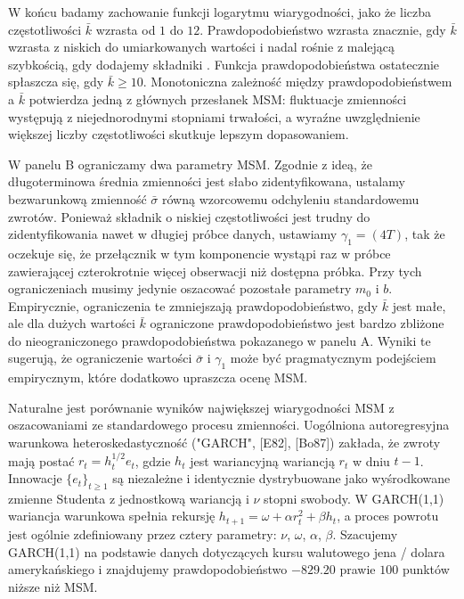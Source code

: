 \documentclass[12pt]{article}
\theoremstyle{definition}
\begin{document}
W końcu badamy zachowanie funkcji logarytmu wiarygodności, jako że liczba częstotliwości $\bar{k}$ wzrasta od $1$ do $12$. Prawdopodobieństwo wzrasta znacznie, gdy $\bar{k}$ wzrasta z niskich do umiarkowanych wartości i nadal rośnie z malejącą szybkością, gdy dodajemy składniki . Funkcja prawdopodobieństwa ostatecznie spłaszcza się, gdy $\bar{k} \geq 10$. Monotoniczna zależność między prawdopodobieństwem a $\bar{k}$ potwierdza jedną z głównych przesłanek MSM: fluktuacje zmienności występują z niejednorodnymi stopniami trwałości, a wyraźne uwzględnienie większej liczby częstotliwości skutkuje lepszym dopasowaniem.

W panelu B ograniczamy dwa parametry MSM. Zgodnie z ideą, że długoterminowa średnia zmienności jest słabo zidentyfikowana, ustalamy bezwarunkową zmienność $\bar{\sigma}$ równą wzorcowemu odchyleniu standardowemu zwrotów. Ponieważ składnik o niskiej częstotliwości jest trudny do zidentyfikowania nawet w długiej próbce danych, ustawiamy $\gamma_1 = (4T)$, tak że oczekuje się, że przełącznik w tym komponencie wystąpi raz w próbce zawierającej czterokrotnie więcej obserwacji niż dostępna próbka. Przy tych ograniczeniach musimy jedynie oszacować pozostałe parametry $m_0$ i $b$. Empirycznie, ograniczenia te zmniejszają prawdopodobieństwo, gdy $\bar{k}$ jest małe, ale dla dużych wartości $\bar{k}$ ograniczone prawdopodobieństwo jest bardzo zbliżone do nieograniczonego prawdopodobieństwa pokazanego w panelu A. Wyniki te sugerują, że ograniczenie wartości $\bar{\sigma}$ i $\gamma_1$ może być pragmatycznym podejściem empirycznym, które dodatkowo upraszcza ocenę MSM.

Naturalne jest porównanie wyników największej wiarygodności MSM z oszacowaniami ze standardowego procesu zmienności. Uogólniona autoregresyjna warunkowa heteroskedastyczność ("GARCH", [E82], [Bo87]) zakłada, że zwroty mają postać $r_t = h^{1/2}_t e_t$, gdzie $h_t$ jest wariancyjną wariancją $r_t$ w dniu $t-1$. Innowacje $\{e_t\}_{t\geq 1}$ są niezależne i identycznie dystrybuowane jako wyśrodkowane zmienne Studenta z jednostkową wariancją i $\nu$ stopni swobody. W GARCH(1,1) wariancja warunkowa spełnia rekursję $h_{t+1} = \omega +\alpha r^{2}_t + \beta h_t$, a proces powrotu jest ogólnie zdefiniowany przez cztery parametry: $\nu$, $\omega$, $\alpha $, $\beta $. Szacujemy GARCH(1,1) na podstawie danych dotyczących kursu walutowego jena / dolara amerykańskiego i znajdujemy prawdopodobieństwo $-829.20$ prawie $100$ punktów niższe niż MSM.
\end{document}
